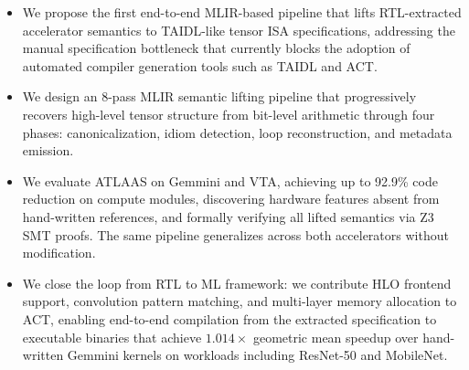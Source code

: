 \begin{itemize}
\item We propose the first end-to-end MLIR-based pipeline that lifts RTL-extracted accelerator semantics to TAIDL-like tensor ISA specifications, addressing the manual specification bottleneck that currently blocks the adoption of automated compiler generation tools such as TAIDL and ACT.
\item We design an 8-pass MLIR semantic lifting pipeline that progressively recovers high-level tensor structure from bit-level arithmetic through four phases: canonicalization, idiom detection, loop reconstruction, and metadata emission.
\item We evaluate ATLAAS on Gemmini and VTA, achieving up to 92.9\% code reduction on compute modules, discovering hardware features absent from hand-written references, and formally verifying all lifted semantics via Z3 SMT proofs. The same pipeline generalizes across both accelerators without modification.
\item We close the loop from RTL to ML framework: we contribute HLO frontend support, convolution pattern matching, and multi-layer memory allocation to ACT, enabling end-to-end compilation from the extracted specification to executable binaries that achieve $1.014\times$ geometric mean speedup over hand-written Gemmini kernels on workloads including ResNet-50 and MobileNet.
\end{itemize}




